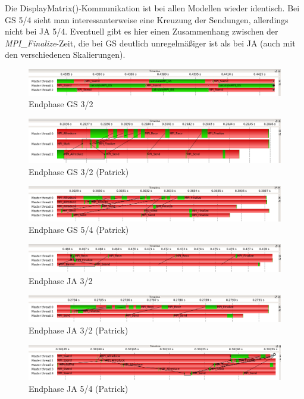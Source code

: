 \documentclass[a4paper,10pt]{article}
\begin{document}
Die DisplayMatrix()-Kommunikation ist bei allen Modellen wieder identisch. Bei GS 5/4 sieht man interessanterweise eine Kreuzung der Sendungen, allerdings nicht bei JA 5/4. Eventuell gibt es hier einen Zusammenhang zwischen der \textit{MPI\_Finalize}-Zeit, die bei GS deutlich unregelmäßiger ist als bei JA (auch mit den verschiedenen Skalierungen).
\begin{figure}[h!]
 \caption{Endphase GS 3/2}
 \includegraphics[width=14cm]{c_end_GS_3x2.png}
\end{figure}

\begin{figure}[h!]
 \caption{Endphase GS 3/2 (Patrick)}
 \includegraphics[width=14cm]{Patrick/c_end_GS_3x2.png}
\end{figure}
\begin{figure}[h!]
 \caption{Endphase GS 5/4 (Patrick)}
 \includegraphics[width=14cm]{Patrick/c_end_GS_5x4.png}
\end{figure}
\begin{figure}[h!]
 \caption{Endphase JA 3/2}
 \includegraphics[width=14cm]{c_end_JA_3x2.png}
\end{figure}
\begin{figure}[h!]
 \caption{Endphase JA 3/2 (Patrick)}
 \includegraphics[width=14cm]{Patrick/c_end_JA_3x2.png}
\end{figure}
\begin{figure}[h!]
 \caption{Endphase JA 5/4 (Patrick)}
 \includegraphics[width=14cm]{Patrick/c_end_JA_5x4.png}
\end{figure}
\end{document}
